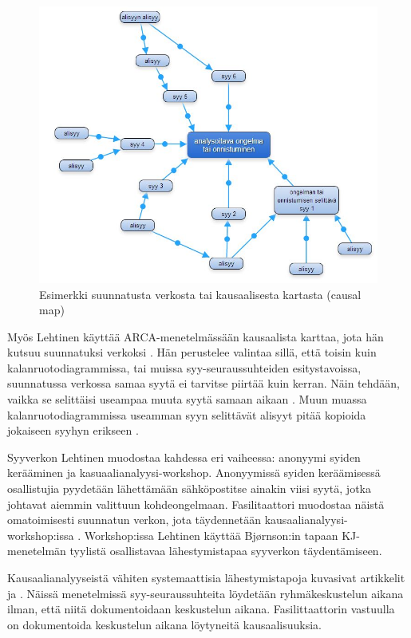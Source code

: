 \begin{figure}[ht!]
\centering
\includegraphics[width=150mm]{suunnattu_verkko_esimerkki_relaatioilla.jpg}
\caption{Esimerkki suunnatusta verkosta tai kausaalisesta kartasta (causal map)}
\label{verkko_ex}
\end{figure}

Myös Lehtinen käyttää ARCA-menetelmässään kausaalista karttaa, jota hän kutsuu suunnatuksi verkoksi \citep{Lehtinen2011}. Hän perustelee valintaa sillä, että toisin kuin kalanruotodiagrammissa, tai muissa syy-seuraussuhteiden esitystavoissa, suunnatussa verkossa samaa syytä ei tarvitse piirtää kuin kerran. Näin tehdään, vaikka se selittäisi useampaa muuta syytä samaan aikaan \citep{Lehtinen2011}. Muun muassa kalanruotodiagrammissa useamman syyn selittävät alisyyt pitää kopioida jokaiseen syyhyn erikseen \citep{Lehtinen2011}. 

Syyverkon Lehtinen muodostaa kahdessa eri vaiheessa: anonyymi syiden kerääminen ja kasuaalianalyysi-workshop. Anonyymissä syiden keräämisessä osallistujia pyydetään lähettämään sähköpostitse ainakin viisi syytä, jotka johtavat aiemmin valittuun kohdeongelmaan. Fasilitaattori muodostaa näistä omatoimisesti suunnatun verkon, jota täydennetään kausaalianalyysi-workshop:issa \citep{Lehtinen2011}. Workshop:issa Lehtinen käyttää Bj{\o}rnson:in tapaan KJ-menetelmän tyylistä osallistavaa lähestymistapaa syyverkon täydentämiseen.

Kausaalianalyyseistä vähiten systemaattisia lähestymistapoja kuvasivat artikkelit \citep{karlsson2006case} ja \citep{staalhane2003post}. Näissä menetelmissä syy-seuraussuhteita löydetään ryhmäkeskustelun aikana ilman, että niitä dokumentoidaan keskustelun aikana. Fasilittaattorin vastuulla on dokumentoida keskustelun aikana löytyneitä kausaalisuuksia.


